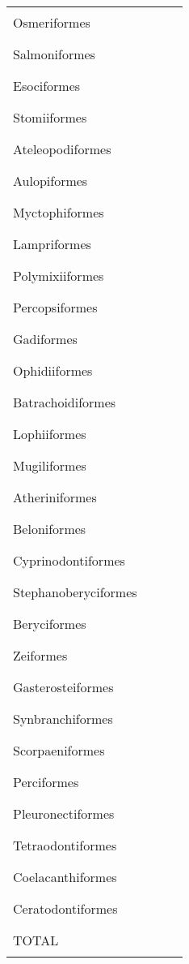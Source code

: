 \documentclass[12pt]{exam}
\newcommand{\tableblank}{\rule{0.8in}{0.4pt}}
\begin{document}
{\begin{longtable}[l]{@{}llll@{}}
Osmeriformes & \tableblank & \tableblank  & \tableblank \tabularnewline
Salmoniformes & \tableblank & \tableblank  & \tableblank \tabularnewline
Esociformes & \tableblank & \tableblank  & \tableblank \tabularnewline
Stomiiformes & \tableblank & \tableblank  & \tableblank \tabularnewline
Ateleopodiformes & \tableblank & \tableblank  & \tableblank \tabularnewline
Aulopiformes & \tableblank & \tableblank  & \tableblank \tabularnewline
Myctophiformes & \tableblank & \tableblank  & \tableblank \tabularnewline
Lampriformes & \tableblank & \tableblank  & \tableblank \tabularnewline
Polymixiiformes & \tableblank & \tableblank  & \tableblank \tabularnewline
Percopsiformes & \tableblank & \tableblank  & \tableblank \tabularnewline
Gadiformes & \tableblank & \tableblank  & \tableblank \tabularnewline
Ophidiiformes & \tableblank & \tableblank  & \tableblank \tabularnewline
Batrachoidiformes & \tableblank & \tableblank  & \tableblank \tabularnewline
Lophiiformes & \tableblank & \tableblank  & \tableblank \tabularnewline
Mugiliformes & \tableblank & \tableblank  & \tableblank \tabularnewline
Atheriniformes & \tableblank & \tableblank  & \tableblank \tabularnewline
Beloniformes & \tableblank & \tableblank  & \tableblank \tabularnewline
Cyprinodontiformes & \tableblank & \tableblank  & \tableblank \tabularnewline
Stephanoberyciformes & \tableblank & \tableblank  & \tableblank \tabularnewline
Beryciformes & \tableblank & \tableblank  & \tableblank \tabularnewline
Zeiformes & \tableblank & \tableblank  & \tableblank \tabularnewline
Gasterosteiformes & \tableblank & \tableblank  & \tableblank \tabularnewline
Synbranchiformes & \tableblank & \tableblank  & \tableblank \tabularnewline
Scorpaeniformes & \tableblank & \tableblank  & \tableblank \tabularnewline
Perciformes & \tableblank & \tableblank  & \tableblank \tabularnewline
Pleuronectiformes & \tableblank & \tableblank  & \tableblank \tabularnewline
Tetraodontiformes & \tableblank & \tableblank  & \tableblank \tabularnewline
Coelacanthiformes & \tableblank & \tableblank  & \tableblank \tabularnewline
Ceratodontiformes & \tableblank & \tableblank  & \tableblank \tabularnewline
\midrule
TOTAL & \tableblank & \tableblank & \tableblank \tabularnewline
\bottomrule
\end{longtable}
}%
\end{document}
